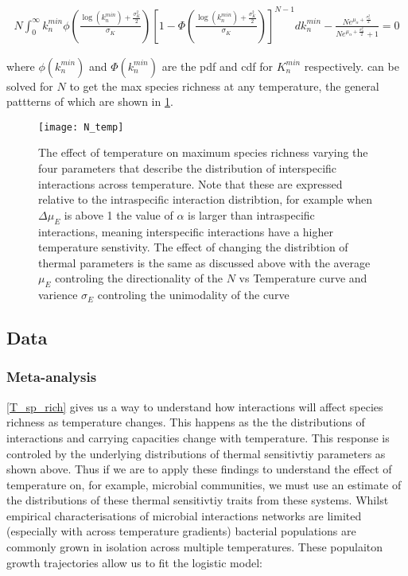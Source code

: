\documentclass{article}
\begin{document}
\begin{align}
  N \int_{0}^{\infty} k_n^{min} \phi \left(\frac{\log(k_n^{min}) + \frac{\sigma_K^2}{2}}{\sigma_K} \right)
  \left[1 - \Phi\left(\frac{\log(k_n^{min}) + \frac{\sigma_K^2}{2}}{\sigma_K} \right) \right]^{N-1} dk_n^{min} -
  \frac{N e^{ \mu_{\alpha} + \frac{\sigma_{\alpha}^2}{2} }}{N e^{ \mu_{\alpha} + \frac{\sigma_{\alpha}^2}{2} } + 1} = 0 \label{T_sp_rich}
\end{align}

where $\phi(k_n^{min})$ and $\Phi(k_n^{min})$ are the pdf and cdf for $K_n^{min}$ respectively.  can be solved for $N$ to get the max species richness at any temperature, the general pattterns of which are shown in \cref{N_temp}.

\begin{figure}
  \texttt{[image: N\_temp]}
  \centering
  \caption{The effect of temperature on maximum species richness varying the four parameters that describe the distribution of interspecific interactions across temperature. Note that these are expressed relative to the intraspecific interaction distribtion, for example when $\Delta\mu_E$ is above 1 the value of $\alpha$ is larger than intraspecific interactions, meaning interspecific interactions have a higher temperature senstivity. The effect of changing the distribtion of thermal parameters is the same as discussed above with the average $\mu_E$ controling the directionality of the $N$ vs Temperature curve and varience $\sigma_E$ controling the unimodality of the curve  }
  \label{N_temp}
\end{figure}

\subsection{Data}
\subsubsection{Meta-analysis}
\cref{T_sp_rich} gives us a way to understand how interactions will affect species richness as temperature changes. This happens as the the distributions of interactions and carrying capacities change with temperature. This response is controled by the underlying distributions of thermal sensitivtiy parameters as shown above. Thus if we are to apply these findings to understand the effect of temperature on, for example, microbial communities, we must use an estimate of the distributions of these thermal sensitivtiy traits from these systems. Whilst empirical characterisations of microbial interactions networks are limited (especially with across temperature gradients) bacterial populations are commonly grown in isolation across multiple temperatures. These populaiton growth trajectories allow us to fit the logistic model:
\end{document}
